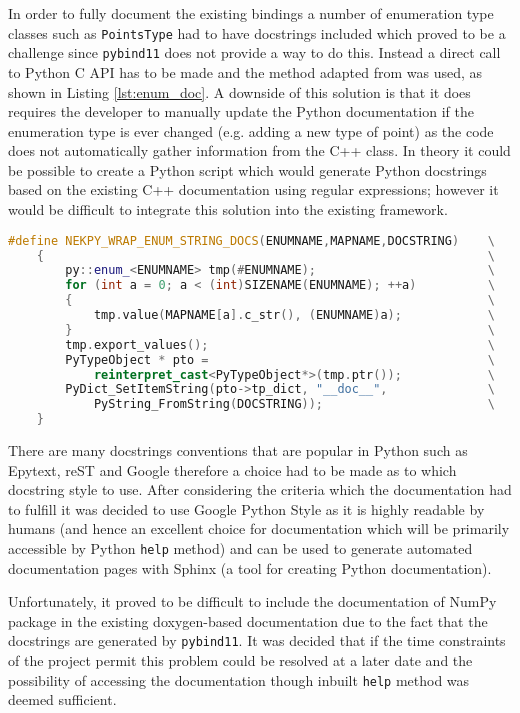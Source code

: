 In order to fully document the existing bindings a number of enumeration type
classes such as \texttt{PointsType} had to have docstrings included which proved
to be a challenge since \texttt{pybind11} does not provide a way to do
this. Instead a direct call to Python C API has to be made and the method
adapted from \cite{PythonEnumDocstring} was used, as shown in Listing
\ref{lst:enum_doc}. A downside of this solution is that it does requires the
developer to manually update the Python documentation if the enumeration type is
ever changed (e.g.  adding a new type of point) as the code does not
automatically gather information from the C++ class. In theory it could be
possible to create a Python script which would generate Python docstrings based
on the existing C++ documentation using regular expressions; however it would be
difficult to integrate this solution into the existing framework.

\begin{lstlisting}[caption={Code used to include dosctings in enumetation type classes - part of \texttt{NekPyConfig.hpp}}, label={lst:enum_doc}, language=C++]
#define NEKPY_WRAP_ENUM_STRING_DOCS(ENUMNAME,MAPNAME,DOCSTRING)    \
    {                                                              \
        py::enum_<ENUMNAME> tmp(#ENUMNAME);                        \
        for (int a = 0; a < (int)SIZENAME(ENUMNAME); ++a)          \
        {                                                          \
            tmp.value(MAPNAME[a].c_str(), (ENUMNAME)a);            \
        }                                                          \
        tmp.export_values();                                       \
        PyTypeObject * pto =                                       \
            reinterpret_cast<PyTypeObject*>(tmp.ptr());            \
        PyDict_SetItemString(pto->tp_dict, "__doc__",              \
            PyString_FromString(DOCSTRING));                       \
    }
\end{lstlisting}

There are many docstrings conventions that are popular in Python such as
Epytext, reST and Google therefore a choice had to be made as to which docstring
style to use. After considering the criteria which the documentation had to
fulfill it was decided to use Google Python Style \cite{PythonGoogle} as it is
highly readable by humans (and hence an excellent choice for documentation which
will be primarily accessible by Python \texttt{help} method) and can be used to
generate automated documentation pages with Sphinx (a tool for creating Python
documentation).

Unfortunately, it proved to be difficult to include the documentation of NumPy
package in the existing doxygen-based documentation due to the fact that the
docstrings are generated by \texttt{pybind11}.  It was decided that if the time
constraints of the project permit this problem could be resolved at a later date
and the possibility of accessing the documentation though inbuilt \texttt{help}
method was deemed sufficient.
